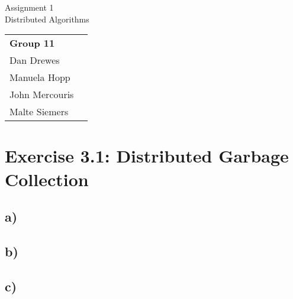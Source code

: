 \documentclass[12pt,a4paper]{article}
\begin{document}
\begin{center}
  \Large Assignment 1\\
  \large Distributed Algorithms
\end{center}
\begin{flushright}
  \begin{tabular}{ll}
    \textbf{Group 11} \\
    Dan Drewes     	  \\ 
    Manuela Hopp       \\ 
    John Mercouris    \\
    Malte Siemers     \\
  \end{tabular} 
\end{flushright}

\section*{Exercise 3.1: Distributed Garbage Collection}
  \subsection*{a)} %
  \subsection*{b)} %
  \subsection*{c)} %
\end{document}
